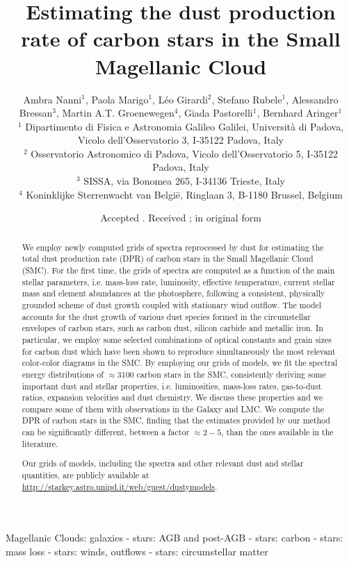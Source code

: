 \documentclass[useAMS,usenatbib]{mn2e/mn2e}
\title[Dust production rate of carbon stars in the SMC]{Estimating the dust production rate of carbon stars in the Small Magellanic Cloud}
\author[Nanni et al.]{Ambra Nanni$^1$,
Paola Marigo$^1$, L\'eo Girardi$^2$, Stefano Rubele$^1$, 
Alessandro Bressan$^3$, \newauthor
Martin A.T. Groenewegen$^4$,
Giada Pastorelli$^1$,
Bernhard Aringer$^1$
  \\
  $^1$ Dipartimento di Fisica e Astronomia Galileo Galilei,
  Universit\`a di Padova, Vicolo dell'Osservatorio 3, I-35122 Padova, Italy\\
  $^2$ Osservatorio Astronomico di Padova, Vicolo dell'Osservatorio 5,
  I-35122 Padova, Italy \\
  $^3$ SISSA, via Bonomea 265, I-34136 Trieste, Italy\\
  $^4$ Koninklijke Sterrenwacht van Belgi\"e, Ringlaan 3, B-1180 Brussel, Belgium  \\
}
\begin{document}
\date{Accepted .  Received ; in original form }

\pagerange{\pageref{firstpage}--\pageref{lastpage}} 

\maketitle


\begin{abstract}\label{firstpage}
We employ newly computed grids of spectra reprocessed by dust for estimating the total dust production rate (DPR) of carbon stars in the Small Magellanic Cloud (SMC).
For the first time, the grids of spectra are computed as a function of the main stellar parameters, i.e. mass-loss rate, luminosity, effective temperature, current stellar mass and element abundances at the photosphere, following a consistent, physically grounded scheme of dust growth coupled with stationary wind outflow. The model accounts for the dust growth of various dust species formed in the circumstellar envelopes of carbon stars, such as carbon dust, silicon carbide and metallic iron. In particular, we employ some selected combinations of optical constants and grain sizes for carbon dust which have been shown to reproduce simultaneously the most relevant color-color diagrams in the SMC. By employing our grids of models, we fit the spectral energy distributions of $\approx$3100 carbon stars in the SMC, consistently deriving some important dust and stellar properties, i.e. luminosities, mass-loss rates, gas-to-dust ratios, expansion velocities and dust chemistry. We discuss these properties and we compare some of them with observations in the Galaxy and LMC. 
We compute the DPR of carbon stars in the SMC, finding that the estimates provided by our method can be significantly different, between a factor $\approx2-5$, than the  ones available in the literature. 

Our grids of models, including the spectra and other relevant dust and stellar quantities, are publicly available at \url{http://starkey.astro.unipd.it/web/guest/dustymodels}.  
 

\end{abstract}

\begin{keywords}
Magellanic Clouds: galaxies - stars: AGB and post-AGB - stars: carbon - stars: mass loss - stars: winds, outflows - stars: circumstellar matter
\end{keywords}
\end{document}
